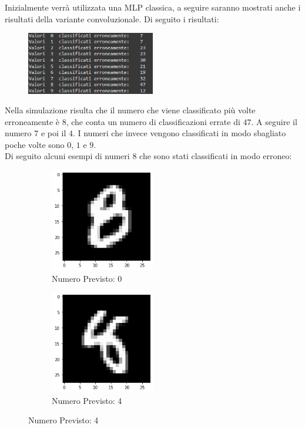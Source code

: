 \documentclass[12pt, a4paper]{article}
\begin{document}
Inizialmente verrà utilizzata una MLP classica, a seguire saranno mostrati anche i risultati della variante convoluzionale.
Di seguito i risultati:
\begin{figure}[H]
    \centering
    \includegraphics[width=0.50\textwidth]{ErrateClassica.png}
\end{figure}

Nella simulazione risulta che il numero che viene classificato più volte erroneamente è \(8\), che conta un numero di classificazioni errate di \(47\). A seguire il numero \(7\) e poi il \(4\). I numeri che invece vengono classificati in modo sbagliato poche volte sono \(0\), \(1\) e \(9\).\\
Di seguito alcuni esempi di numeri \(8\) che sono stati classificati in modo erroneo:

\begin{figure}[H]
    \centering
    \begin{subfigure}{.5\textwidth}
        \centering
        \caption{Numero Previsto: 0}
        \includegraphics[width=0.50\textwidth]{otto1.png}
    \end{subfigure}%
    \begin{subfigure}{.5\textwidth}
        \centering
        \caption{Numero Previsto: 4}
        \includegraphics[width=0.50\textwidth]{otto2.png}
    \end{subfigure} 
\end{figure}
\end{document}
